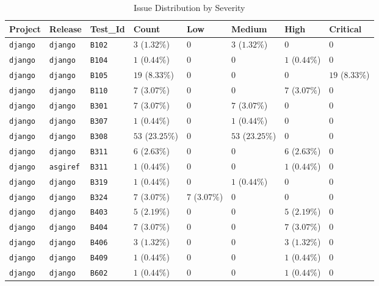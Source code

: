 \begin{table}
\caption{Issue Distribution by Severity}
\label{tab:issue-distribution}
\begin{tabular}{llllllll}
\toprule
Project & Release & Test_Id & Count & Low & Medium & High & Critical \\
\midrule
\texttt{django} & \texttt{django} & \texttt{B102} & $3$ ($1.32\%$) & $0$ & $3$ ($1.32\%$) & $0$ & $0$ \\
\texttt{django} & \texttt{django} & \texttt{B104} & $1$ ($0.44\%$) & $0$ & $0$ & $1$ ($0.44\%$) & $0$ \\
\texttt{django} & \texttt{django} & \texttt{B105} & $19$ ($8.33\%$) & $0$ & $0$ & $0$ & $19$ ($8.33\%$) \\
\texttt{django} & \texttt{django} & \texttt{B110} & $7$ ($3.07\%$) & $0$ & $0$ & $7$ ($3.07\%$) & $0$ \\
\texttt{django} & \texttt{django} & \texttt{B301} & $7$ ($3.07\%$) & $0$ & $7$ ($3.07\%$) & $0$ & $0$ \\
\texttt{django} & \texttt{django} & \texttt{B307} & $1$ ($0.44\%$) & $0$ & $1$ ($0.44\%$) & $0$ & $0$ \\
\texttt{django} & \texttt{django} & \texttt{B308} & $53$ ($23.25\%$) & $0$ & $53$ ($23.25\%$) & $0$ & $0$ \\
\texttt{django} & \texttt{django} & \texttt{B311} & $6$ ($2.63\%$) & $0$ & $0$ & $6$ ($2.63\%$) & $0$ \\
\texttt{django} & \texttt{asgiref} & \texttt{B311} & $1$ ($0.44\%$) & $0$ & $0$ & $1$ ($0.44\%$) & $0$ \\
\texttt{django} & \texttt{django} & \texttt{B319} & $1$ ($0.44\%$) & $0$ & $1$ ($0.44\%$) & $0$ & $0$ \\
\texttt{django} & \texttt{django} & \texttt{B324} & $7$ ($3.07\%$) & $7$ ($3.07\%$) & $0$ & $0$ & $0$ \\
\texttt{django} & \texttt{django} & \texttt{B403} & $5$ ($2.19\%$) & $0$ & $0$ & $5$ ($2.19\%$) & $0$ \\
\texttt{django} & \texttt{django} & \texttt{B404} & $7$ ($3.07\%$) & $0$ & $0$ & $7$ ($3.07\%$) & $0$ \\
\texttt{django} & \texttt{django} & \texttt{B406} & $3$ ($1.32\%$) & $0$ & $0$ & $3$ ($1.32\%$) & $0$ \\
\texttt{django} & \texttt{django} & \texttt{B409} & $1$ ($0.44\%$) & $0$ & $0$ & $1$ ($0.44\%$) & $0$ \\
\texttt{django} & \texttt{django} & \texttt{B602} & $1$ ($0.44\%$) & $0$ & $0$ & $1$ ($0.44\%$) & $0$ \\

\end{tabular}
\end{table}
